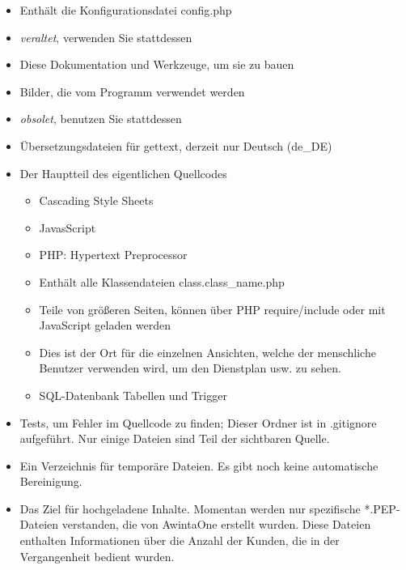 \begin{itemize}
\item {} Enthält die Konfigurationsdatei config.php
\item {} \emph{veraltet}, verwenden Sie stattdessen
\item {} Diese Dokumentation und Werkzeuge, um sie zu bauen
\item {} Bilder, die vom Programm verwendet werden
\item {} \emph{obsolet}, benutzen Sie stattdessen 
\item {} Übersetzungsdateien für gettext, derzeit nur Deutsch
(de\_DE)
\item {} Der Hauptteil des eigentlichen Quellcodes
    \begin{itemize}
    \item {} Cascading Style Sheets
    \item {} JavasScript
    \item {} PHP: Hypertext Preprocessor
    \item {} Enthält alle Klassendateien
class.class\_name.php
    \item {} Teile von größeren Seiten, können über PHP
require/include oder mit JavaScript geladen werden
    \item {} Dies ist der Ort für die einzelnen
Ansichten, welche der menschliche Benutzer verwenden wird, um den Dienstplan
usw. zu sehen.
    \item {} SQL-Datenbank Tabellen und Trigger
    \end{itemize}
\item {} Tests, um Fehler im Quellcode zu finden; Dieser Ordner
ist in .gitignore aufgeführt. Nur einige Dateien sind Teil der sichtbaren
Quelle.
\item {} Ein Verzeichnis für temporäre Dateien. Es gibt noch keine automatische Bereinigung.
\item {} Das Ziel für hochgeladene Inhalte. Momentan werden nur
spezifische *.PEP-Dateien verstanden, die von AwintaOne erstellt wurden.
Diese Dateien enthalten Informationen über die Anzahl der Kunden, die in der Vergangenheit bedient wurden.
\end{itemize}

